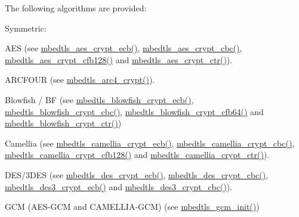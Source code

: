 The following algorithms are provided\-:
\begin{DoxyItemize}
\item Symmetric\-:
\begin{DoxyItemize}
\item A\-E\-S (see {\ttfamily \hyperlink{aes_8h_a0e59fdda18a145e702984268b9ab291a}{mbedtls\-\_\-aes\-\_\-crypt\-\_\-ecb()}}, {\ttfamily \hyperlink{aes_8h_a321834eafbf0dacb36dac343bfd6b35d}{mbedtls\-\_\-aes\-\_\-crypt\-\_\-cbc()}}, {\ttfamily \hyperlink{aes_8h_a944946adabbc344f2c6cf6e6f51a21e3}{mbedtls\-\_\-aes\-\_\-crypt\-\_\-cfb128()}} and {\ttfamily \hyperlink{aes_8h_a375c98cba4c5806d3a39c7d1e1e226da}{mbedtls\-\_\-aes\-\_\-crypt\-\_\-ctr()}}).
\item A\-R\-C\-F\-O\-U\-R (see {\ttfamily \hyperlink{arc4_8h_a51d378246f0c277a68352cdac782e8fb}{mbedtls\-\_\-arc4\-\_\-crypt()}}).
\item Blowfish / B\-F (see {\ttfamily \hyperlink{blowfish_8h_afe15cef6820aa39a999e7268bf6f4c29}{mbedtls\-\_\-blowfish\-\_\-crypt\-\_\-ecb()}}, {\ttfamily \hyperlink{blowfish_8h_a24f95511214b38914090036938cbc045}{mbedtls\-\_\-blowfish\-\_\-crypt\-\_\-cbc()}}, {\ttfamily \hyperlink{blowfish_8h_af3996e5bb50864497b0c7349819ffd12}{mbedtls\-\_\-blowfish\-\_\-crypt\-\_\-cfb64()}} and {\ttfamily \hyperlink{blowfish_8h_a7d1688bf5fb906fdbad101e08bc8bf85}{mbedtls\-\_\-blowfish\-\_\-crypt\-\_\-ctr()}})
\item Camellia (see {\ttfamily \hyperlink{camellia_8h_a4399c4d56cd27ffb610abeb70d51f8f7}{mbedtls\-\_\-camellia\-\_\-crypt\-\_\-ecb()}}, {\ttfamily \hyperlink{camellia_8h_a6121d988f0fa571adbb3eea80560c545}{mbedtls\-\_\-camellia\-\_\-crypt\-\_\-cbc()}}, {\ttfamily \hyperlink{camellia_8h_afffb8f6eeac954fbdddb3c99ad0f87c6}{mbedtls\-\_\-camellia\-\_\-crypt\-\_\-cfb128()}} and {\ttfamily \hyperlink{camellia_8h_ae90ed9ce4edf59d5219c64a0d2b3d23d}{mbedtls\-\_\-camellia\-\_\-crypt\-\_\-ctr()}}).
\item D\-E\-S/3\-D\-E\-S (see {\ttfamily \hyperlink{des_8h_aa713501cc3e30c39a763b4568698f5c1}{mbedtls\-\_\-des\-\_\-crypt\-\_\-ecb()}}, {\ttfamily \hyperlink{des_8h_a95353a2f0d2e8d1377f43f71ca12a231}{mbedtls\-\_\-des\-\_\-crypt\-\_\-cbc()}}, {\ttfamily \hyperlink{des_8h_a933b8f629cc201e06f5e89396d065204}{mbedtls\-\_\-des3\-\_\-crypt\-\_\-ecb()}} and {\ttfamily \hyperlink{des_8h_a4f5bb9106306e11c906abfa46fc51b94}{mbedtls\-\_\-des3\-\_\-crypt\-\_\-cbc()}}).
\item G\-C\-M (A\-E\-S-\/\-G\-C\-M and C\-A\-M\-E\-L\-L\-I\-A-\/\-G\-C\-M) (see {\ttfamily \hyperlink{gcm_8h_ac3f60a663c6b01ef6d977ac06aac57df}{mbedtls\-\_\-gcm\-\_\-init()}})

\end{DoxyItemize}
\end{DoxyItemize}
